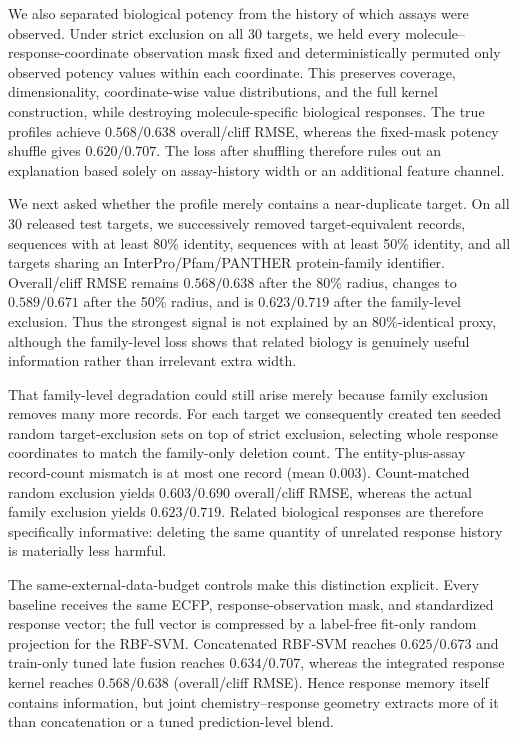 \documentclass[manuscript,nonacm]{acmart}
\begin{document}
We also separated biological potency from the history of which assays were
observed.  Under strict exclusion on all 30 targets, we held every
molecule--response-coordinate observation mask fixed and deterministically
permuted only observed potency values within each coordinate.  This preserves
coverage, dimensionality, coordinate-wise value distributions, and the full
kernel construction, while destroying molecule-specific biological responses.
The true profiles achieve $0.568/0.638$ overall/cliff RMSE, whereas the
fixed-mask potency shuffle gives $0.620/0.707$.  The loss after shuffling
therefore rules out an explanation based solely on assay-history width or an
additional feature channel.

We next asked whether the profile merely contains a near-duplicate target.
On all 30 released test targets, we successively removed target-equivalent
records, sequences with at least 80\% identity, sequences with at least 50\%
identity, and all targets sharing an InterPro/Pfam/PANTHER protein-family
identifier.  Overall/cliff RMSE remains $0.568/0.638$ after the 80\% radius,
changes to $0.589/0.671$ after the 50\% radius, and is $0.623/0.719$ after
the family-level exclusion.  Thus the strongest signal is not explained by an
80\%-identical proxy, although the family-level loss shows that related
biology is genuinely useful information rather than irrelevant extra width.

That family-level degradation could still arise merely because family exclusion
removes many more records.  For each target we consequently created ten
seeded random target-exclusion sets on top of strict exclusion, selecting
whole response coordinates to match the family-only deletion count.  The
entity-plus-assay record-count mismatch is at most one record (mean 0.003).
Count-matched random exclusion yields $0.603/0.690$ overall/cliff RMSE,
whereas the actual family exclusion yields $0.623/0.719$.  Related biological
responses are therefore specifically informative: deleting the same quantity
of unrelated response history is materially less harmful.

The same-external-data-budget controls make this distinction explicit.  Every
baseline receives the same ECFP, response-observation mask, and standardized
response vector; the full vector is compressed by a label-free fit-only random
projection for the RBF-SVM.  Concatenated RBF-SVM reaches $0.625/0.673$ and
train-only tuned late fusion reaches $0.634/0.707$, whereas the integrated
response kernel reaches $0.568/0.638$ (overall/cliff RMSE).  Hence response
memory itself contains information, but joint chemistry--response geometry
extracts more of it than concatenation or a tuned prediction-level blend.
\end{document}
